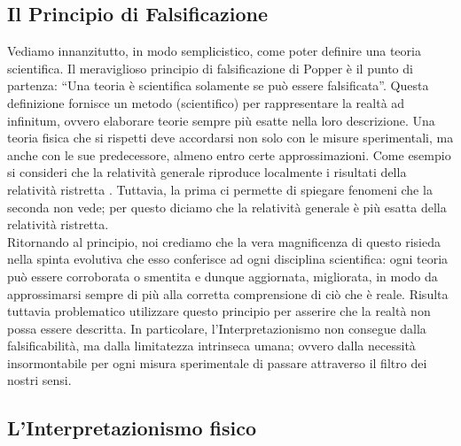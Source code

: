 \documentclass[]{article}
\begin{document}
	\subsection{Il Principio di Falsificazione}
	Vediamo innanzitutto, in modo semplicistico, come poter definire una teoria scientifica.
	Il meraviglioso principio di falsificazione di Popper è il punto di partenza: \enquote{Una teoria è scientifica solamente se può essere falsificata}. Questa definizione fornisce un metodo (scientifico) per rappresentare la realtà ad infinitum, ovvero elaborare teorie sempre più esatte nella loro descrizione. Una teoria fisica che si rispetti deve accordarsi non solo con le misure sperimentali, ma anche con le sue predecessore, almeno entro certe approssimazioni. Come esempio si consideri che la relatività generale riproduce localmente i risultati della relatività ristretta%
	. Tuttavia, la prima ci permette di spiegare fenomeni che la seconda non vede; per questo diciamo che la relatività generale è più esatta della relatività ristretta. \\
	Ritornando al principio, noi crediamo che la vera magnificenza di questo risieda nella spinta evolutiva che esso conferisce ad ogni disciplina scientifica: ogni teoria può essere corroborata o smentita e dunque aggiornata, migliorata, in modo da approssimarsi sempre di più alla corretta comprensione di ciò che è reale. 
	Risulta tuttavia problematico utilizzare questo principio per asserire che la realtà non possa essere descritta. In particolare, l'Interpretazionismo non consegue dalla falsificabilità, ma dalla limitatezza intrinseca umana; ovvero dalla necessità insormontabile per ogni misura sperimentale di passare attraverso il filtro dei nostri sensi.  
	
	\subsection{L'Interpretazionismo fisico}
	
\end{document}
